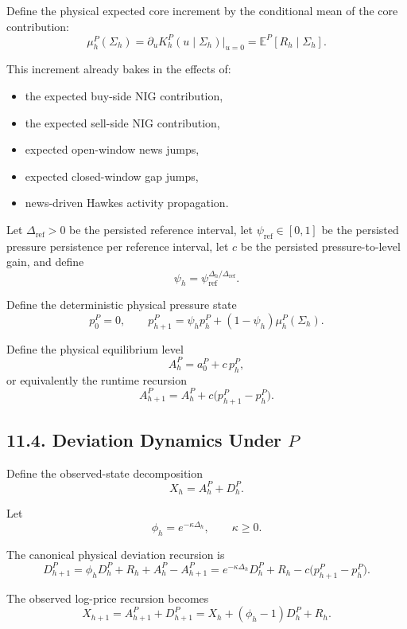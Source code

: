 \documentclass[11pt]{article}
\begin{document}
    Define the physical expected core increment by the conditional mean of the
    core contribution:
    \[
        \mu_h^P(\Sigma_h)
        =
        \partial_u K_h^P(u \mid \Sigma_h)\big|_{u=0}
        =
        \mathbb E^P[R_h \mid \Sigma_h].
    \]

    This increment already bakes in the effects of:
    \begin{itemize}
        \item the expected buy-side NIG contribution,
        \item the expected sell-side NIG contribution,
        \item expected open-window news jumps,
        \item expected closed-window gap jumps,
        \item news-driven Hawkes activity propagation.
    \end{itemize}

    Let \(\Delta_{\mathrm{ref}} > 0\) be the persisted reference interval, let
    \(\psi_{\mathrm{ref}} \in [0,1]\) be the persisted pressure persistence per
    reference interval, let \(c\) be the persisted pressure-to-level gain, and
    define
    \[
        \psi_h = \psi_{\mathrm{ref}}^{\Delta_h / \Delta_{\mathrm{ref}}}.
    \]

    Define the deterministic physical pressure state
    \[
        p_0^P = 0,
        \qquad
        p_{h+1}^P = \psi_h p_h^P + (1-\psi_h)\mu_h^P(\Sigma_h).
    \]

    Define the physical equilibrium level
    \[
        A_h^P = a_0^P + c\,p_h^P,
    \]
    or equivalently the runtime recursion
    \[
        A_{h+1}^P = A_h^P + c\big(p_{h+1}^P - p_h^P\big).
    \]

    \subsection*{11.4. Deviation Dynamics Under \(P\)}

    Define the observed-state decomposition
    \[
        X_h = A_h^P + D_h^P.
    \]

    Let
    \[
        \phi_h = e^{-\kappa \Delta_h},
        \qquad
        \kappa \ge 0.
    \]

    The canonical physical deviation recursion is
    \[
        D_{h+1}^P
        =
        \phi_h D_h^P + R_h + A_h^P - A_{h+1}^P
        =
        e^{-\kappa \Delta_h} D_h^P + R_h - c\big(p_{h+1}^P - p_h^P\big).
    \]

    The observed log-price recursion becomes
    \[
        X_{h+1}
        =
        A_{h+1}^P + D_{h+1}^P
        =
        X_h + (\phi_h - 1) D_h^P + R_h.
    \]
\end{document}
